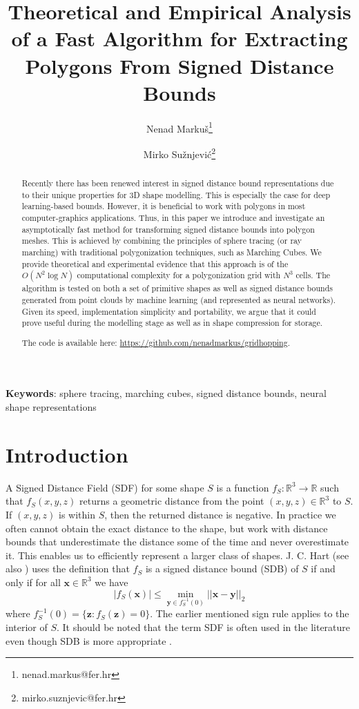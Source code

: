 \documentclass[11pt,twocolumn]{article}
\title{Theoretical and Empirical Analysis of a Fast Algorithm for Extracting Polygons From Signed Distance Bounds}
\author{Nenad Marku\v{s}\thanks{nenad.markus@fer.hr}}
\author{Mirko Su\v{z}njevi\'{c}\thanks{mirko.suznjevic@fer.hr}}
\affil{University of Zagreb Faculty of Electrical Engineering and Computing\\Unska 3, 10000 Zagreb, Croatia}
\date{}
\begin{document}
	\maketitle

	\begin{abstract}
        Recently there has been renewed interest in signed distance bound representations due to their unique properties for 3D shape modelling.
        This is especially the case for deep learning-based bounds.
        However, it is beneficial to work with polygons in most computer-graphics applications.
		Thus, in this paper we introduce and investigate an asymptotically fast method for transforming signed distance bounds into polygon meshes.
		This is achieved by combining the principles of sphere tracing (or ray marching) with traditional polygonization techniques, such as Marching Cubes.
		We provide theoretical and experimental evidence that this approach is of the $O(N^2\log N)$ computational complexity for a polygonization grid with $N^3$ cells.
		The algorithm is tested on both a set of primitive shapes as well as signed distance bounds generated from point clouds by machine learning (and represented as neural networks).
		Given its speed, implementation simplicity and portability, we argue that it could prove useful during the modelling stage as well as in shape compression for storage.

		The code is available here: \url{https://github.com/nenadmarkus/gridhopping}.
	\end{abstract}

    \textbf{Keywords}: sphere tracing, marching cubes, signed distance bounds, neural shape representations

	\section{Introduction}
  		A Signed Distance Field (SDF) for some shape $S$ is a function $f_S:\mathbb{R}^3\rightarrow\mathbb{R}$ such that $f_S(x, y, z)$ returns a geometric distance from the point $(x, y, z)\in\mathbb{R}^3$ to $S$.
		If $(x, y, z)$ is within $S$, then the returned distance is negative.
		In practice we often cannot obtain the exact distance to the shape, but work with distance bounds that underestimate the distance some of the time and never overestimate it.
		This enables us to efficiently represent a larger class of shapes.
        J. C. Hart \cite{Hart94spheretracing} (see also \cite{HartEtAl89rtfractals}) uses the definition that $f_S$ is a signed distance bound (SDB) of $S$ if and only if for all $\mathbf{x}\in\mathbb{R}^3$ we have
		$$
			\vert f_S(\mathbf{x})\vert\leq
			\min_{\mathbf{y}\in f_S^{-1}(0)}\vert\vert\mathbf{x} - \mathbf{y}\vert\vert_2
		$$
		where $f_S^{-1}(0)=\{\mathbf{z}: f_S(\mathbf{z})=0\}$.
		The earlier mentioned sign rule applies to the interior of $S$.
        It should be noted that the term SDF is often used in the literature even though SDB is more appropriate \cite{Hart94spheretracing,HartEtAl89rtfractals}.
  
\end{document}
